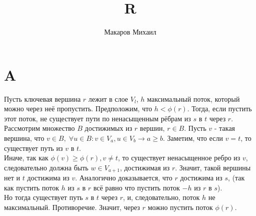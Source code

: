 \documentclass{article}
\title{R}
\author{Макаров Михаил}
\date{}
\begin{document}
	\maketitle

    \section{A}
    Пусть ключевая вершина $r$ лежит в слое $V_l$, $h$ максимальный поток, который можно через неё пропустить.
    Предположим, что $h < \phi(r)$. Тогда, если пустить этот поток, не существует пути по ненасыщенным рёбрам
    из $s$ в $t$ через $r$. Рассмотрим множество $B$ достижимых из $r$ вершин, $r \in B$. Пусть 
    $v$ - такая вершина, что $v \in B, \; \forall u \in B: v \in V_a, u \in V_b \rightarrow a \geq b$.
    Заметим, что если $v = t$, то существует путь из $v$ в $t$.\\
    Иначе, так как $\phi(v) \geq \phi(r), v \neq t$, то существует ненасыщенное ребро из $v$, следовательно
    должна быть $w \in V_{a + 1}$, достижимая из $r$. Значит, такой вершины нет и $t$ достижима из $v$.
    Аналогично доказывается, что $r$ достижима из $s$, (так как пустить поток $h$ из $s$ в $r$ всё равно что
    пустить поток $-h$ из $r$ в $s$).\\
    Но тогда существует путь $s$ в $t$ через $r$, и, следовательно, поток $h$ не максимальный. Противоречие.
    Значит, через $r$ можно пустить поток $\phi(r)$.
\end{document}
